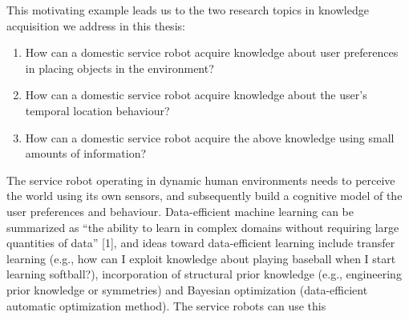 \documentclass[11pt]{book}
\begin{document}
This motivating example leads us to the two research topics in knowledge acquisition we address in this thesis:
\begin{enumerate}
	\item How can a domestic service robot acquire knowledge about user preferences in placing objects in the environment?
	\item How can a domestic service robot acquire knowledge about the user's temporal location behaviour?
	\item How can a domestic service robot acquire the above knowledge using small amounts of information?
\end{enumerate}

The service robot operating in dynamic human environments needs to perceive the world using its own sensors, and subsequently build a cognitive model of the user preferences and behaviour. Data-efficient machine learning can be summarized as “the ability to learn in complex domains without requiring large quantities of data” [1], and ideas toward data-efficient learning include transfer learning (e.g., how can I exploit knowledge about playing baseball when I start learning softball?), incorporation of structural prior knowledge (e.g., engineering prior knowledge or symmetries) and Bayesian optimization (data-efficient automatic optimization method). The service robots can use this 

\end{document}
